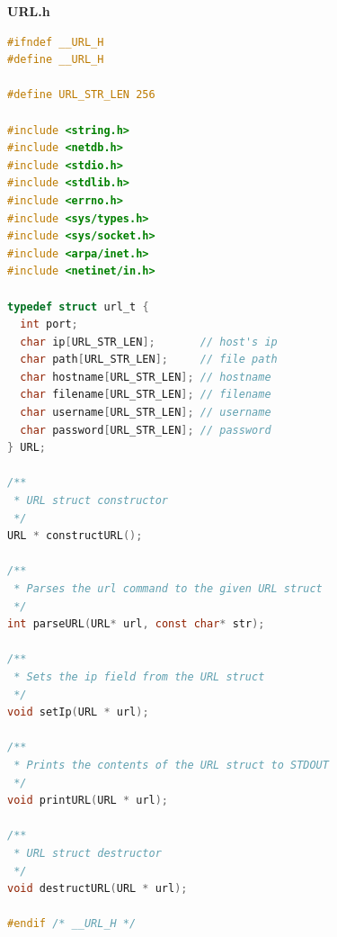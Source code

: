 \documentclass[a4paper, 11pt]{article}
\begin{document}
\huge\textbf{URL.h}
\begin{lstlisting}[language=C]
#ifndef __URL_H
#define __URL_H

#define URL_STR_LEN 256

#include <string.h>
#include <netdb.h>
#include <stdio.h>
#include <stdlib.h>
#include <errno.h>
#include <sys/types.h>
#include <sys/socket.h>
#include <arpa/inet.h>
#include <netinet/in.h>

typedef struct url_t {
  int port;
  char ip[URL_STR_LEN];       // host's ip
  char path[URL_STR_LEN];     // file path
  char hostname[URL_STR_LEN]; // hostname
  char filename[URL_STR_LEN]; // filename
  char username[URL_STR_LEN]; // username
  char password[URL_STR_LEN]; // password
} URL;

/**
 * URL struct constructor
 */
URL * constructURL();

/**
 * Parses the url command to the given URL struct
 */
int parseURL(URL* url, const char* str);

/**
 * Sets the ip field from the URL struct
 */
void setIp(URL * url);

/**
 * Prints the contents of the URL struct to STDOUT
 */
void printURL(URL * url);

/**
 * URL struct destructor
 */
void destructURL(URL * url);

#endif /* __URL_H */
\end{lstlisting}
\newpage
\end{document}
